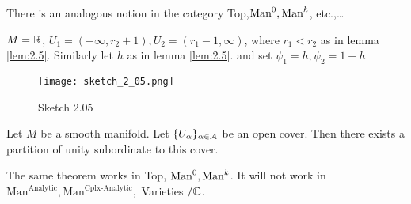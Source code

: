 \begin{remark}
    There is an analogous notion in the category Top,\(\man0,\mank\), etc.,\dots
\end{remark}

\begin{example}
    \(M=\mathbb{R}\), \(U_1=(-\infty,r_2+1),U_2=(r_1-1,\infty)\), where \(r_1<r_2\) as in lemma \ref{lem:2.5}.
    Similarly let \(h\) as in lemma \ref{lem:2.5}. and set \(\psi_1=h,\psi_2=1-h\)
    \begin{figure}[H]
        \centering
        \texttt{[image: sketch\_2\_05.png]}
        \caption{Sketch 2.05}
    \end{figure}
\end{example}

\begin{theorem}\label{thm:2.7}
    Let \(M\) be a smooth manifold. Let \(\{U_{\alpha}\}_{\alpha\in\mathcal{A}}\) be an open cover. 
    Then there exists a partition of unity subordinate to this cover. 
\end{theorem}

\begin{remark}
    The same theorem works in Top, \(\man0,\mank\). It will not work in \(\text{Man}^{\text{Analytic}},\text{Man}^{\text{Cplx-Analytic}},\) Varieties \(/\mathbb{C}\).
\end{remark}

